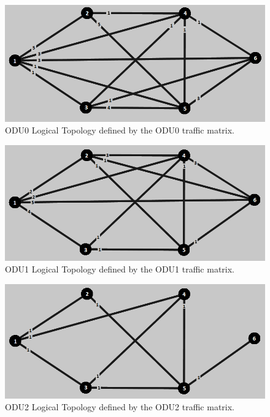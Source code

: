 \begin{figure}[H]
\centering
\includegraphics[width=13cm]{sdf/heuristic/opaque_survivability/low/logical_topology_odu0_low}
\caption{ODU0 Logical Topology defined by the ODU0 traffic matrix.}
\label{logical_ODU0_surv_ref_low_heuristic}
\end{figure}

\begin{figure}[H]
\centering
\includegraphics[width=13cm]{sdf/heuristic/opaque_survivability/low/logical_topology_odu1_low}
\caption{ODU1 Logical Topology defined by the ODU1 traffic matrix.}
\label{logical_ODU1_surv_ref_low_heuristic}
\end{figure}

\begin{figure}[H]
\centering
\includegraphics[width=13cm]{sdf/heuristic/opaque_survivability/low/logical_topology_odu2_low}
\caption{ODU2 Logical Topology defined by the ODU2 traffic matrix.}
\label{logical_ODU2_surv_ref_low_heuristic}
\end{figure}

